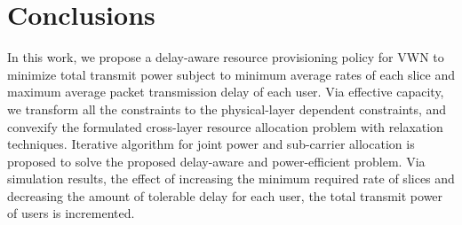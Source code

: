 \documentclass[journal,draftclsnofoot,12pt,onecolumn]{IEEEtran}
\begin{document}
\section{Conclusions}
In this work, we propose a delay-aware resource provisioning policy
for VWN to minimize total transmit power subject to minimum average
rates of each slice and maximum average packet transmission delay of
each user. Via effective capacity, we transform all the constraints
to the physical-layer dependent constraints, and convexify the
formulated cross-layer resource allocation problem with relaxation
techniques. {Iterative algorithm for joint power and
sub-carrier allocation is proposed to solve the proposed delay-aware
and power-efficient problem. Via simulation results, the effect of increasing the minimum required rate of slices and decreasing the amount of tolerable delay for each user, the total transmit power of users is incremented.  } %
\begin{singlespace}
    
    
\end{singlespace}
\end{document}
